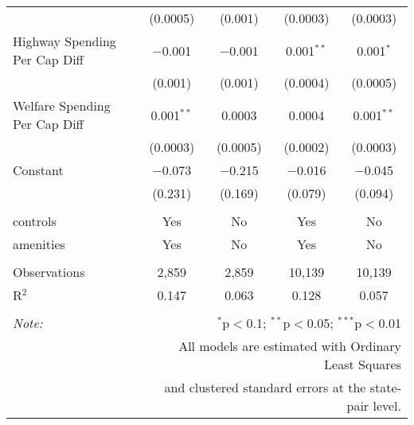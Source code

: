\begin{table}[!htbp]
\begin{tabular}{@{\extracolsep{5pt}}lcccc}
  & (0.0005) & (0.001) & (0.0003) & (0.0003) \\ 
  Highway Spending Per Cap Diff & $-$0.001 & $-$0.001 & 0.001$^{**}$ & 0.001$^{*}$ \\ 
  & (0.001) & (0.001) & (0.0004) & (0.0005) \\ 
  Welfare Spending Per Cap Diff & 0.001$^{**}$ & 0.0003 & 0.0004 & 0.001$^{**}$ \\ 
  & (0.0003) & (0.0005) & (0.0002) & (0.0003) \\ 
  Constant & $-$0.073 & $-$0.215 & $-$0.016 & $-$0.045 \\ 
  & (0.231) & (0.169) & (0.079) & (0.094) \\ 
 \hline \\[-1.8ex] 
controls & Yes & No & Yes & No \\ 
amenities & Yes & No & Yes & No \\ 
\hline \\[-1.8ex] 
Observations & 2,859 & 2,859 & 10,139 & 10,139 \\ 
R$^{2}$ & 0.147 & 0.063 & 0.128 & 0.057 \\ 
\hline 
\hline \\[-1.8ex] 
\textit{Note:}  & \multicolumn{4}{r}{$^{*}$p$<$0.1; $^{**}$p$<$0.05; $^{***}$p$<$0.01} \\ 
 & \multicolumn{4}{r}{All models are estimated with Ordinary Least Squares} \\ 
 & \multicolumn{4}{r}{and clustered standard errors at the state-pair level.} \\ 
\end{tabular} 
\end{table} 
